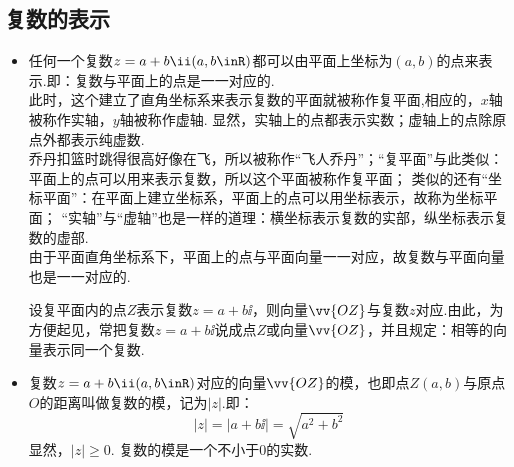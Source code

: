   \subsection{复数的表示}
    \begin{itemize}
      \item %
        任何一个复数$z=a+b\ii(a,b\inR)$都可以由平面上坐标为$(a,b)$的点来表示.即：{\kaishu 复数与平面上的点是一一对应的}.\\
        此时，这个建立了直角坐标系来表示复数的平面就被称作{\fsong 复平面},相应的，$x$轴被称作{\fsong 实轴}，$y$轴被称作{\fsong 虚轴}.
        显然，{\kaishu 实轴上的点都表示实数；虚轴上的点除原点外都表示纯虚数}.\\
        {\kaishu \hspace{2em}乔丹扣篮时跳得很高好像在飞，所以被称作“飞人乔丹”；“复平面”与此类似：平面上的点可以用来表示复数，所以这个平面被称作复平面；
         类似的还有“坐标平面”：在平面上建立坐标系，平面上的点可以用坐标表示，故称为坐标平面；
         “实轴”与“虚轴”也是一样的道理：横坐标表示复数的实部，纵坐标表示复数的虚部.}\\
        由于平面直角坐标系下，平面上的点与平面向量一一对应，故复数与平面向量也是一一对应的.\\
        \begin{center}\vspace{-2em}\vspace{-1.5em}
        \end{center}
        设复平面内的点$Z$表示复数$z=a+b\ii$，则向量$\vv{OZ}$与复数$z$对应.由此，为方便起见，常把复数$z=a+b\ii$说成点$Z$或向量$\vv{OZ}$，并且规定：相等的向量表示同一个复数.
        \\ 
      \item 复数$z=a+b\ii(a,b\inR)$对应的向量$\vv{OZ}$的模，也即点$Z(a,b)$与原点$O$的距离叫做复数的模，记为$|z|$.即：
        \[|z|=|a+b\ii|=\sqrt{a^2+b^2}\]
        显然，$|z|\geqslant0$.
        {\kaishu 复数的模是一个不小于0的实数.}
        \\
    \end{itemize}
